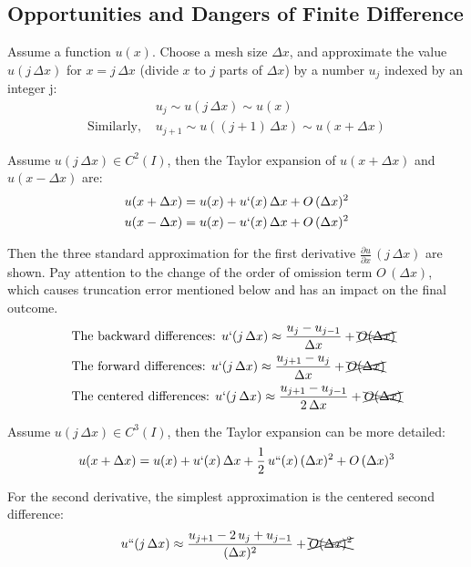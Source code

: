 \documentclass[../main.tex]{subfiles}
\begin{document}
\subsection{Opportunities and Dangers of Finite Difference}

Assume a function $u(x)$. Choose a mesh size $\Delta x$, and approximate the value $u(j \, \Delta x)$ for $x = j \, \Delta x$ (divide $x$ to $j$ parts of $\Delta x$) by a number $u_j$ indexed by an integer j:
\begin{align*}
    & u_j \sim u(j \, \Delta x) \sim u(x)\\
    \text{Similarly, } & u_{j+1} \sim u((j+1) \, \Delta x) \sim u(x + \Delta x)
\end{align*}

Assume $u(j \, \Delta x) \in C^2(I)$, then the Taylor expansion of $u(x + \Delta x)$ and $u(x - \Delta x)$ are:
\begin{align*}
    u(x + \Delta x) = u(x) + u`(x) \, \Delta x + O \, (\Delta x)^2 \\
    u(x - \Delta x) = u(x) - u`(x) \, \Delta x + O \, (\Delta x)^2
\end{align*}

Then the three standard approximation for the first derivative $\frac{\partial u}{\partial x} \, (j \, \Delta x)$ are shown. Pay attention to the change of the order of omission term $O \, (\Delta x)$, which causes truncation error mentioned below and has an impact on the final outcome.
\begin{align}
    & \text{The backward differences: } u`(j \, \Delta x) \approx \frac{u_j - u_{j-1}}{\Delta x} + \xcancel{O(\Delta x)} \label{eq:FD1} \\
    & \text{The forward differences: } u`(j \, \Delta x) \approx \frac{u_{j+1} - u_j}{\Delta x} + \xcancel{O(\Delta x)} \label{eq:FD2} \\
    & \text{The centered differences: } u`(j \, \Delta x) \approx \frac{u_{j+1} - u_{j-1}}{2 \, \Delta x} + \xcancel{O(\Delta x)} \label{eq:FD3} 
\end{align}

Assume $u(j \, \Delta x) \in C^3(I)$, then the Taylor expansion can be more detailed:
\begin{align*}
    u(x + \Delta x) = u(x) + u`(x) \, \Delta x + \frac{1}{2} \, u``(x) \, (\Delta x)^2 + O \, (\Delta x)^3
\end{align*}

For the second derivative, the simplest approximation is the centered second difference:
\begin{align}
    u``(j \, \Delta x) \approx \frac{u_{j+1} - 2\, u_j + u_{j-1}}{(\Delta x)^2} + \xcancel{O(\Delta x)^2} \label{eq:FD4}
\end{align}
\end{document}
